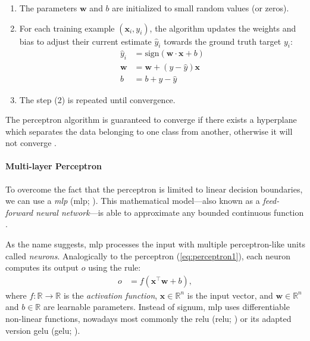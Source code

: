 \begin{enumerate}
    \item The parameters $\textbf{w}$ and $b$ are initialized to small random values (or zeros).
    \item For each training example $(\mathbf{x}_i, y_i)$, the algorithm updates the weights and bias to adjust their current estimate $\hat{y}_i$ towards the ground truth target $y_i$:
          \begin{align} \label{eq:perceptron1}
              \hat{y}_i  & = \text{sign}(\textbf{w} \cdot \mathbf{x} + b) \\
              \textbf{w} & = \textbf{w} + (y - \hat{y}) \textbf{x}        \\
              b          & = b + y - \hat{y}
          \end{align}
    \item The step (2) is repeated until convergence.
\end{enumerate}

The perceptron algorithm is guaranteed to converge if there exists a hyperplane which separates the data belonging to one class from another, otherwise it will not converge \cite{novikoff1962convergence}.

\paragraph{Multi-layer Perceptron} To overcome the fact that the perceptron is limited to linear decision boundaries, we can use a \emph{\acl{mlp}} (\acs{mlp}; \citealp[p.~164]{goodfellow2016deep}). This mathematical model---also known as a \emph{feed-forward neural network}---is able to approximate any bounded continuous function \cite{hornik1989multilayer}.

As the name suggests, \ac{mlp} processes the input with multiple perceptron-like units called \textit{neurons}. Analogically to the perceptron (\autoref{eq:perceptron1}), each neuron computes its output $o$ using the rule:
\begin{align}
    o & = f(\mathbf{x}^\top \mathbf{w}  + b),
\end{align}
where $f: \mathbb{R} \rightarrow \mathbb{R}$ is the \emph{activation function}, $\mathbf{x}\in \mathbb{R}^n$ is the input vector, and $\mathbf{w} \in \mathbb{R}^n$ and $b \in \mathbb{R}$ are learnable parameters. Instead of signum, \ac{mlp} uses differentiable non-linear functions, nowadays most commonly the \acl{relu} (\acs{relu}; \citealp{nair2010rectified}) or its adapted version \acl{gelu} (\acs{gelu}; \citealp{hendrycks2016gaussian}).

